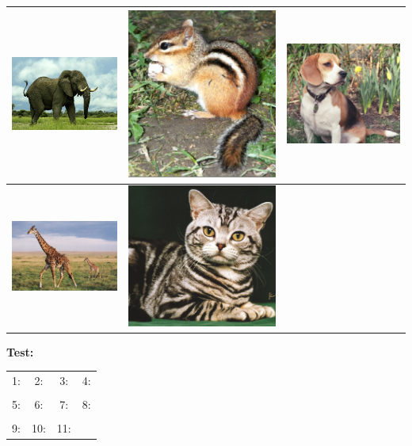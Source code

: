 \documentclass[fleqn]{article}
\begin{document}
\begin{tabular}{|c|c|c|}
\hline
\includegraphics[width=.25\textwidth]{african-elephant2.jpg}
&
\includegraphics[width=.25\textwidth]{chipmunk1.jpg}
&
\includegraphics[width=.25\textwidth]{Dog_Olive.jpg}
\\
\hline
\includegraphics[width=.25\textwidth]{giraffe.jpg}
&
\includegraphics[width=.25\textwidth]{Tabby1-DomesticCat-Closeup.jpg}
&
\\
\hline
\end{tabular}

{\bf\Huge Test:}

\begin{Large}
\begin{tabular}{cccc}
1: \underline{\quad\quad\quad\quad}&
2: \underline{\quad\quad\quad\quad}&
3: \underline{\quad\quad\quad\quad}&
4: \underline{\quad\quad\quad\quad}\\ &&&\\
5: \underline{\quad\quad\quad\quad}&
6: \underline{\quad\quad\quad\quad}&
7: \underline{\quad\quad\quad\quad}&
8: \underline{\quad\quad\quad\quad}\\ &&&\\
9: \underline{\quad\quad\quad\quad}&
10: \underline{\quad\quad\quad\quad}&
11: \underline{\quad\quad\quad\quad}&
\end{tabular}
\end{Large}
\end{document}
